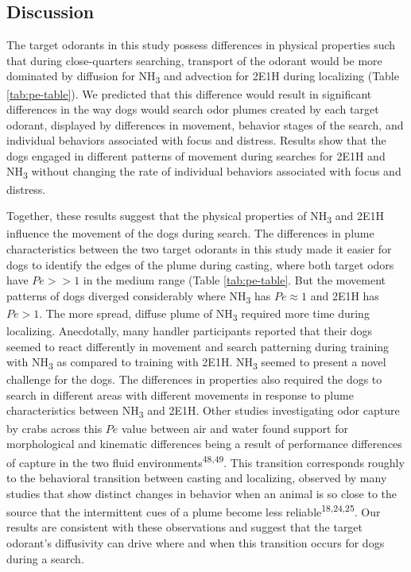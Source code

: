 \documentclass[
]{article}
\begin{document}
\hypertarget{discussion}{%
\subsection{Discussion}\label{discussion}}

The target odorants in this study possess differences in physical properties such that during close-quarters searching, transport of the odorant would be more dominated by diffusion for NH\textsubscript{3} and advection for 2E1H during localizing (Table \ref{tab:pe-table}). We predicted that this difference would result in significant differences in the way dogs would search odor plumes created by each target odorant, displayed by differences in movement, behavior stages of the search, and individual behaviors associated with focus and distress. Results show that the dogs engaged in different patterns of movement during searches for 2E1H and NH\textsubscript{3} without changing the rate of individual behaviors associated with focus and distress.

Together, these results suggest that the physical properties of NH\textsubscript{3} and 2E1H influence the movement of the dogs during search. The differences in plume characteristics between the two target odorants in this study made it easier for dogs to identify the edges of the plume during casting, where both target odors have \(Pe >> 1\) in the medium range (Table \ref{tab:pe-table}. But the movement patterns of dogs diverged considerably where NH\textsubscript{3} has \(Pe \approx 1\) and 2E1H has \(Pe > 1\). The more spread, diffuse plume of NH\textsubscript{3} required more time during localizing. Anecdotally, many handler participants reported that their dogs seemed to react differently in movement and search patterning during training with NH\textsubscript{3} as compared to training with 2E1H. NH\textsubscript{3} seemed to present a novel challenge for the dogs. The differences in properties also required the dogs to search in different areas with different movements in response to plume characteristics between NH\textsubscript{3} and 2E1H. Other studies investigating odor capture by crabs across this \(Pe\) value between air and water found support for morphological and kinematic differences being a result of performance differences of capture in the two fluid environments\textsuperscript{48,49}. This transition corresponds roughly to the behavioral transition between casting and localizing, observed by many studies that show distinct changes in behavior when an animal is so close to the source that the intermittent cues of a plume become less reliable\textsuperscript{18,24,25}. Our results are consistent with these observations and suggest that the target odorant's diffusivity can drive where and when this transition occurs for dogs during a search.
\end{document}
